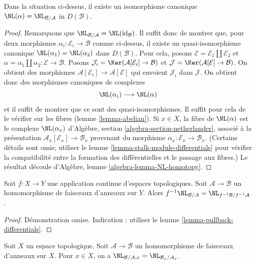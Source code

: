\begin{lemma}
\label{lemma-NL-up-to-qis}
Dans la situation ci-dessus, il existe un isomorphisme canonique
$\NL(\alpha) = \NL_{\mathcal{B}/\mathcal{A}}$ in $D(\mathcal{B})$.
\end{lemma}

\begin{proof}
Remarquons que
$\NL_{\mathcal{B}/\mathcal{A}} = \NL(\text{id}_\mathcal{B})$. Il suffit
donc de montrer que, pour deux morphismes
$\alpha_i : \mathcal{E}_i \to \mathcal{B}$ comme ci-dessus, il existe un
quasi-isomorphisme canonique
$\NL(\alpha_1) = \NL(\alpha_2)$ dans $D(\mathcal{B})$. Pour cela, posons
$\mathcal{E} = \mathcal{E}_1 \amalg \mathcal{E}_2$ et
$\alpha = \alpha_1 \amalg \alpha_2 : \mathcal{E} \to \mathcal{B}$.
Posons
$\mathcal{J}_i = \Ker(\mathcal{A}[\mathcal{E}_i] \to \mathcal{B})$
et
$\mathcal{J} = \Ker(\mathcal{A}[\mathcal{E}] \to \mathcal{B})$.
On obtient des morphismes
$\mathcal{A}[\mathcal{E}_i] \to \mathcal{A}[\mathcal{E}]$ qui envoient
$\mathcal{J}_i$ dans $\mathcal{J}$. On obtient donc des morphismes
canoniques de complexes
$$
\NL(\alpha_i) \longrightarrow \NL(\alpha)
$$
et il suffit de montrer que ce sont des quasi-isomorphismes. Il suffit pour
cela de le vérifier sur les fibres (lemme \ref{lemma-abelian}). Si $x \in X$,
la fibre de $\NL(\alpha)$ est le complexe $\NL(\alpha_x)$ d'Algèbre,
section \ref{algebra-section-netherlander}, associé à la présentation
$\mathcal{A}_x[\mathcal{E}_x] \to \mathcal{B}_x$ provenant du morphisme
$\alpha_x : \mathcal{E}_x \to \mathcal{B}_x$. (Certains détails sont omis;
utiliser le lemme \ref{lemma-stalk-module-differentials} pour vérifier la
compatibilité entre la formation des différentielles et le passage aux
fibres.) Le résultat découle d'Algèbre, lemme
\ref{algebra-lemma-NL-homotopy}.
\end{proof}

\begin{lemma}
\label{lemma-pullback-NL}
Soit $f : X \to Y$ une application continue d'espaces topologiques. Soit
$\mathcal{A} \to \mathcal{B}$ un homomorphisme de faisceaux d'anneaux sur
$Y$. Alors $f^{-1}\NL_{\mathcal{B}/\mathcal{A}} =
\NL_{f^{-1}\mathcal{B}/f^{-1}\mathcal{A}}$.
\end{lemma}

\begin{proof}
Démonstration omise. Indication : utiliser le lemme
\ref{lemma-pullback-differentials}.
\end{proof}

\begin{lemma}
\label{lemma-stalk-NL}
Soit $X$ un espace topologique. Soit $\mathcal{A} \to \mathcal{B}$ un
homomorphisme de faisceaux d'anneaux sur $X$. Pour $x \in X$, on a
$\NL_{\mathcal{B}/\mathcal{A}, x} =
\NL_{\mathcal{B}_x/\mathcal{A}_x}$.
\end{lemma}

